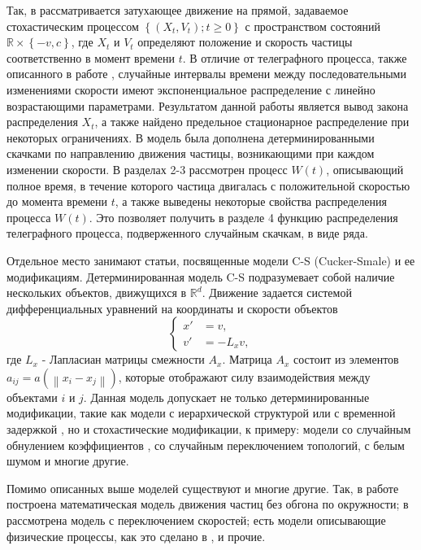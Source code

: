 \documentclass[12pt,a4paper]{article}
\begin{document}
Так, в \cite{crescenzo} рассматривается затухающее движение на прямой, задаваемое стохастическим процессом $\left\{ \left( X_t, V_t \right); t \ge 0\right\}$ с пространством состояний $\mathbb{R} \times \left\{ -v, c \right\}$, где $X_t$ и $V_t$ определяют положение и скорость частицы соответственно в момент времени $t$. В отличие от телеграфного процесса, также описанного в работе \cite{crescenzo}, случайные интервалы времени между последовательными изменениями скорости имеют экспоненциальное распределение с линейно возрастающими параметрами. Результатом данной работы является вывод закона распределения $X_t$, а также найдено предельное стационарное распределение при некоторых ограничениях. В \cite{crescenzo2} модель была дополнена детерминированными скачками по направлению движения частицы, возникающими при каждом изменении скорости. В разделах 2-3 \cite{crescenzo2} рассмотрен процесс $W(t)$, описывающий полное время, в течение которого частица двигалась с положительной скоростью до момента времени $t$, а также выведены некоторые свойства распределения процесса $W(t)$. Это позволяет получить в разделе 4 \cite{crescenzo2} функцию распределения телеграфного процесса, подверженного случайным скачкам, в виде ряда.

Отдельное место занимают статьи, посвященные модели C-S (Cucker-Smale) и ее модификациям. Детерминированная модель C-S подразумевает собой наличие нескольких объектов, движущихся в $\mathbb{R}^d$. Движение задается системой дифференциальных уравнений на координаты и скорости объектов
\begin{equation*}
    \left\{\begin{aligned}
        x' & = v,\\
        v' & = - L_x v,
    \end{aligned}\right.
\end{equation*}
где $L_x$ - Лапласиан матрицы смежности $A_x$. Матрица $A_x$ состоит из элементов\\ $a_{i j} = a (\left\| x_i - x_j \right\|)$, которые отображают силу взаимодействия между объектами $i$ и $j$. Данная модель допускает не только детерминированные модификации, такие как модели с иерархической структурой \cite{shen} или с временной задержкой \cite{erban}, но и стохастические модификации, к примеру: модели со случайным обнулением коэффициентов \cite{dalmao}, со случайным переключением топологий\cite{dong}, с белым шумом \cite{ha, erban} и многие другие.

Помимо описанных выше моделей существуют и многие другие. Так, в работе \cite{hajiyev} построена математическая модель движения частиц без обгона по окружности; в \cite{lykov} рассмотрена модель с переключением скоростей; есть модели описывающие физические процессы, как это сделано в \cite{simon}, и прочие.
\end{document}
